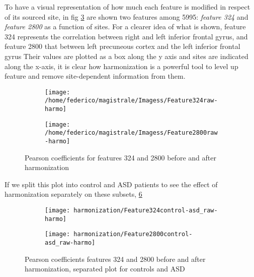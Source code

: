 \documentclass[a4paper,11pt]{article}
\begin{document}
To have a visual representation of how much each feature is modified in respect of its sourced site, in fig \ref{fig:features_raw-harmo} are shown two features among 5995: \emph{feature 324} and \emph{feature 2800} as a function of sites.
For a clearer idea of what is shown, feature 324 represents the correlation between right and left inferior frontal gyrus, and feature 2800 that between left precuneous cortex and the left inferior frontal gyrus
Their values are plotted as a box along the y axis and sites are indicated along the x-axis, it is clear how harmonization is a powerful tool to level up feature and remove site-dependent information from them.

\begin{figure}
\centering
\begin{subfigure}[b]{1.\textwidth}
   \texttt{[image: /home/federico/magistrale/Imagess/Feature324raw-harmo]}
   \caption{}
   \label{fig:feature324}
\end{subfigure}
\begin{subfigure}[b]{1.\textwidth}
   \texttt{[image: /home/federico/magistrale/Imagess/Feature2800raw-harmo]}
   \caption{}
   \label{fig:feature2800}
\end{subfigure}
\caption{Pearson coefficients for features 324 and 2800 before and after harmonization}
\label{fig:features_raw-harmo}
\end{figure}

 If we split this plot into control and ASD patients to see the effect of harmonization separately on these subsets, \ref{fig:features_control-asd_raw-harmo}

 \begin{figure}
 \centering
 \begin{subfigure}[b]{1.\textwidth}
    \texttt{[image: harmonization/Feature324control-asd\_raw-harmo]}
    \caption{}
    \label{fig:feature324-control-asd}
 \end{subfigure}
 \begin{subfigure}[b]{1.\textwidth}
    \texttt{[image: harmonization/Feature2800control-asd\_raw-harmo]}
    \caption{}
    \label{fig:feature2800control-asd}
 \end{subfigure}
 \caption{Pearson coefficients features 324 and 2800 before and after harmonization, separated plot for controls and ASD}
 \label{fig:features_control-asd_raw-harmo}
 \end{figure}
\end{document}
